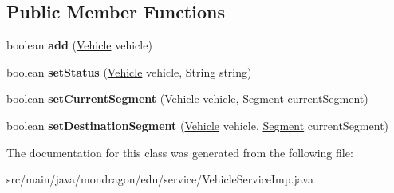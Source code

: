 \subsection*{Public Member Functions}
\begin{DoxyCompactItemize}
\item 
\mbox{\label{classmondragon_1_1edu_1_1service_1_1_vehicle_service_imp_a840f3ca7eca8e430266fc477d42cd25d}} 
boolean {\bfseries add} (\mbox{\hyperlink{classmondragon_1_1edu_1_1clases_1_1_vehicle}{Vehicle}} vehicle)
\item 
\mbox{\label{classmondragon_1_1edu_1_1service_1_1_vehicle_service_imp_a117774378ba5fb79bda33d62fb8d9750}} 
boolean {\bfseries set\+Status} (\mbox{\hyperlink{classmondragon_1_1edu_1_1clases_1_1_vehicle}{Vehicle}} vehicle, String string)
\item 
\mbox{\label{classmondragon_1_1edu_1_1service_1_1_vehicle_service_imp_add04c9f83405fa535e8fa47b6ba7a858}} 
boolean {\bfseries set\+Current\+Segment} (\mbox{\hyperlink{classmondragon_1_1edu_1_1clases_1_1_vehicle}{Vehicle}} vehicle, \mbox{\hyperlink{classmondragon_1_1edu_1_1clases_1_1_segment}{Segment}} current\+Segment)
\item 
\mbox{\label{classmondragon_1_1edu_1_1service_1_1_vehicle_service_imp_ae0132f9ce7c86af52261930da7db5e9a}} 
boolean {\bfseries set\+Destination\+Segment} (\mbox{\hyperlink{classmondragon_1_1edu_1_1clases_1_1_vehicle}{Vehicle}} vehicle, \mbox{\hyperlink{classmondragon_1_1edu_1_1clases_1_1_segment}{Segment}} current\+Segment)
\end{DoxyCompactItemize}


The documentation for this class was generated from the following file\+:\begin{DoxyCompactItemize}
\item 
src/main/java/mondragon/edu/service/Vehicle\+Service\+Imp.\+java\end{DoxyCompactItemize}
